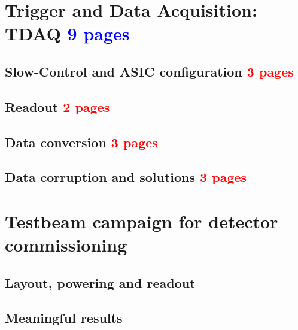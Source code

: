 	\section{Trigger and Data Acquisition: TDAQ \textcolor{blue}{ 9 pages}}
		\subsection{Slow-Control and ASIC configuration \textcolor{red}{ 3 pages}}
		\subsection{Readout \textcolor{red}{ 2 pages}}
		\subsection{Data conversion \textcolor{red}{ 3 pages}}
		\subsection{Data corruption and solutions  \textcolor{red}{ 3 pages}}
		
	\clearpage
	\section{Testbeam campaign for detector commissioning}
		\subsection{Layout, powering and readout}
		\subsection{Meaningful results}